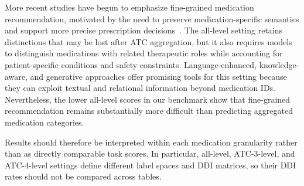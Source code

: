\documentclass[manuscript,review]{acmart}
\begin{document}
More recent studies have begun to emphasize fine-grained medication recommendation, motivated by the need to preserve medication-specific semantics and support more precise prescription decisions~\cite{zhao2025lamo,fan2026fine}. The all-level setting retains distinctions that may be lost after ATC aggregation, but it also requires models to distinguish medications with related therapeutic roles while accounting for patient-specific conditions and safety constraints. Language-enhanced, knowledge-aware, and generative approaches offer promising tools for this setting because they can exploit textual and relational information beyond medication IDs. Nevertheless, the lower all-level scores in our benchmark show that fine-grained recommendation remains substantially more difficult than predicting aggregated medication categories.

Results should therefore be interpreted within each medication granularity rather than as directly comparable task scores. In particular, all-level, ATC-3-level, and ATC-4-level settings define different label spaces and DDI matrices, so their DDI rates should not be compared across tables. 




\end{document}
